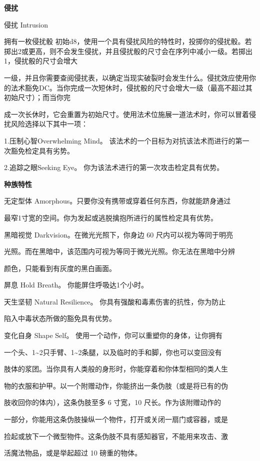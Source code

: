 \documentclass[letterpaper,openany,twoside,twocolumn]{book}
\begin{document}
\par\noindent\textbf{侵扰}\par
侵扰 Intrusion\par
拥有一枚侵扰骰 初始d8，使用一个具有侵扰风险的特性时，投掷你的侵扰骰。若掷出2或更高，则不会发生侵扰，并且侵扰骰的尺寸会在序列中减小一级。若掷出1，侵扰骰的尺寸会增大\par
一级，并且你需要查阅侵扰表，以确定当现实破裂时会发生什么。侵扰效应使用你的法术豁免DC。当你完成一次短休时，侵扰骰的尺寸会增大一级（最高不超过其初始尺寸）；而当你完\par
成一次长休时，它会重置为初始尺寸。使用法术位施展一道法术时，你可以冒着侵扰风险选择以下其中一项：\par
1.压制心智Overwhelming Mind。 该法术的一个目标为对抗该法术而进行的第一次豁免检定具有劣势。\par
2.追踪之眼Seeking Eye。 你为该法术进行的第一次攻击检定具有优势。\par


\par\noindent\textbf{种族特性}\par
无定型体 Amorphous。只要你没有携带或穿着任何东西，你就能跻身通过\par
最窄1寸宽的空间。你为发起或逃脱擒抱所进行的属性检定具有优势。\par
黑暗视觉 Darkvision。在微光光照下，你身边 60 尺内可以视为等同于明亮\par
光照。而在黑暗中，该范围内可视为等同于微光光照。你无法在黑暗中分辨\par
颜色，只能看到有灰度的黑白画面。\par
屏息 Hold Breath。 你能屏住呼吸达1个小时。\par
天生坚韧 Natural Resilience。 你具有强酸和毒素伤害的抗性，你为防止\par
陷入中毒状态所做的豁免具有优势。\par
变化自身 Shape Self。 使用一个动作，你可以重塑你的身体，让你拥有\par
一个头、1\textasciitilde{}2只手臂、1\textasciitilde{}2条腿，以及临时的手和脚，你也可以变回没有\par
肢体的浆团。当你具有人类般的身形时，你能穿着和你体型相同的类人生\par
物的衣服和护甲。以一个附赠动作，你能挤出一条伪肢（或是将已有的伪\par
肢收回你的体内），这条伪肢至多 6 寸宽，10 尺长。作为该附赠动作的\par
一部分，你能用这条伪肢操纵一个物件，打开或关闭一扇门或容器，或是\par
捡起或放下一个微型物件。这条伪肢不具有感知器官，不能用来攻击、激\par
活魔法物品，或是举起超过 10 磅重的物体。\par
\end{document}
